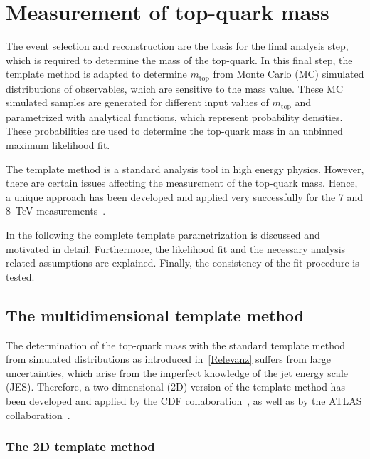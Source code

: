 \chapter{Measurement of top-quark mass}
\label{sec:Temp1}

The event selection and \rm reconstruction are the basis for the final analysis step, which is required to determine the mass of the top-quark. In this final step, the template method  is adapted to determine $m_{\text{top}}$  from Monte Carlo (MC) simulated distributions of observables, which are sensitive to the mass value. These MC simulated samples are generated for different input values of $m_{\text{top}}$ and parametrized with analytical functions, which represent probability densities. These probabilities are used to determine the top-quark mass in an unbinned maximum likelihood fit.

 The template method is a standard analysis tool in high energy physics. However, there are certain issues affecting the measurement of the top-quark mass.  Hence, a unique approach has been developed and applied very successfully for the 7 and 8~TeV measurements~\cite{Aad:2015nba,ATLAS-CONF-2017-071}.

In the following the complete template parametrization is discussed and motivated in detail. Furthermore, the likelihood fit and the necessary analysis related assumptions are explained. Finally, the consistency of the fit procedure is tested. 


\section{The multidimensional template method}



The determination of the top-quark mass with the standard template method from simulated distributions as introduced in~\cref{Relevanz}  suffers from large uncertainties, which arise from the imperfect knowledge of the jet energy scale (JES). 
Therefore, a two-dimensional (2D) version of the template method has been developed and  applied  by the CDF collaboration~\cite{Aaltonen:2011dr}, as well as by the ATLAS collaboration~\cite{ATLAS:2012aj}.

\subsection{ The 2D template method}

